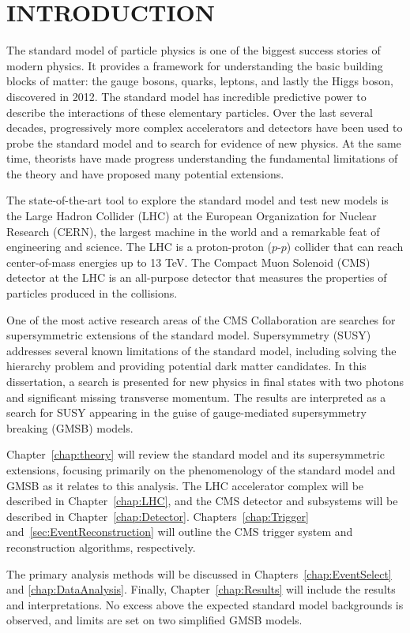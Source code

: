 \chapter{INTRODUCTION}

The standard model of particle physics is one of the biggest success stories of modern physics. It provides a framework for understanding the basic building blocks of matter: the gauge bosons, quarks, leptons, and lastly the Higgs boson, discovered in 2012. The standard model 
has incredible predictive power to describe the interactions of these elementary particles. Over the last several decades, progressively more complex accelerators and detectors have been used to probe the standard model and to search for evidence of new physics. At the same time, theorists have made progress understanding the fundamental limitations of the theory and have proposed many potential extensions.

The state-of-the-art tool to explore the standard model and test new models is the Large Hadron Collider (LHC) at the European Organization for Nuclear Research (CERN), the largest machine in the world and a remarkable feat of engineering and science. The LHC is a proton-proton ($p$-$p$) collider that can reach center-of-mass energies up to 13 TeV. The Compact Muon Solenoid (CMS) detector at the LHC is an all-purpose detector that measures the properties of particles produced in the collisions. 

One of the most active research areas of the CMS Collaboration are searches for supersymmetric extensions of the standard model. Supersymmetry (SUSY) addresses several known limitations of the standard model, 
including solving the hierarchy problem and providing potential dark matter candidates. 
In this dissertation, a search is presented for new physics 
in final states with two photons and significant missing transverse momentum. 
The results are interpreted as a search for SUSY 
appearing in the guise of gauge-mediated supersymmetry breaking (GMSB) models.

Chapter~\ref{chap:theory} will review the standard model and its supersymmetric extensions, focusing primarily on the phenomenology of the standard model and GMSB as it relates to this analysis. The LHC accelerator complex will be described in Chapter~\ref{chap:LHC}, and the 
CMS detector and subsystems will be described in Chapter~\ref{chap:Detector}. Chapters~\ref{chap:Trigger} and~\ref{sec:EventReconstruction} will outline the CMS trigger system and reconstruction algorithms, respectively. 

The primary analysis methods will be discussed in Chapters~\ref{chap:EventSelect} and \ref{chap:DataAnalysis}.
Finally, Chapter~\ref{chap:Results} will include the results and interpretations. No excess above the 
expected standard model backgrounds is observed, and limits are set on two simplified GMSB models.
